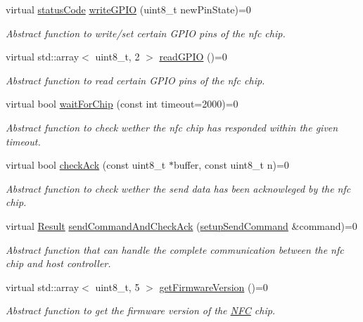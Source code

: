 \begin{DoxyCompactItemize}
virtual \hyperlink{declarations_8h_ae1d20c5a38cae82ccaa6a77be3fd264b}{status\+Code} \hyperlink{classnfc_1_1NFC_a606b08348cb8176a38b2dd9fc1136888}{write\+G\+P\+IO} (uint8\+\_\+t new\+Pin\+State)=0
\begin{DoxyCompactList}\small\item\em Abstract function to write/set certain G\+P\+IO pins of the nfc chip. \end{DoxyCompactList}\item 
virtual std\+::array$<$ uint8\+\_\+t, 2 $>$ \hyperlink{classnfc_1_1NFC_a2d2ccf98ac7faaa8652a69c0242e031c}{read\+G\+P\+IO} ()=0
\begin{DoxyCompactList}\small\item\em Abstract function to read certain G\+P\+IO pins of the nfc chip. \end{DoxyCompactList}\item 
virtual bool \hyperlink{classnfc_1_1NFC_a71585d021800a85b4a52a212d6313b1f}{wait\+For\+Chip} (const int timeout=2000)=0
\begin{DoxyCompactList}\small\item\em Abstract function to check wether the nfc chip has responded within the given timeout. \end{DoxyCompactList}\item 
virtual bool \hyperlink{classnfc_1_1NFC_a9d859ed12251d6d553d9f5c09bbb10ef}{check\+Ack} (const uint8\+\_\+t $\ast$buffer, const uint8\+\_\+t n)=0
\begin{DoxyCompactList}\small\item\em Abstract function to check wether the send data has been acknowleged by the nfc chip. \end{DoxyCompactList}\item 
virtual \hyperlink{structnfc_1_1Result}{Result} \hyperlink{classnfc_1_1NFC_a2a14e65f49707ef1efaea07ec9fce1c8}{send\+Command\+And\+Check\+Ack} (\hyperlink{classsetupSendCommand}{setup\+Send\+Command} \&command)=0
\begin{DoxyCompactList}\small\item\em Abstract function that can handle the complete communication between the nfc chip and host controller. \end{DoxyCompactList}\item 
virtual std\+::array$<$ uint8\+\_\+t, 5 $>$ \hyperlink{classnfc_1_1NFC_a25a4f9824ac567c8ca37ea3486d32882}{get\+Firmware\+Version} ()=0
\begin{DoxyCompactList}\small\item\em Abstract function to get the firmware version of the \hyperlink{classnfc_1_1NFC}{N\+FC} chip. \end{DoxyCompactList}\item 

\end{DoxyCompactItemize}
